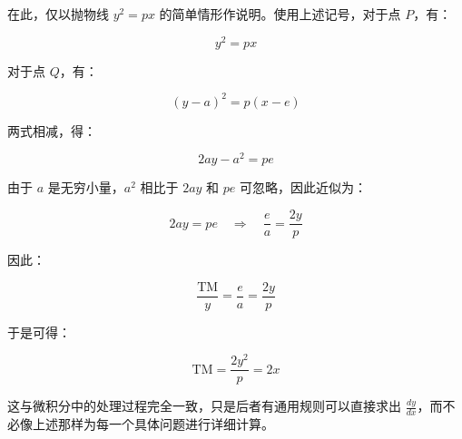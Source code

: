 在此，仅以抛物线 $y^2 = px$ 的简单情形作说明。使用上述记号，对于点 $P$，有：

$$
y^2 = px
$$

对于点 $Q$，有：

$$
(y - a)^2 = p(x - e)
$$

两式相减，得：

$$
2ay - a^2 = pe
$$

由于 $a$ 是无穷小量，$a^2$ 相比于 $2ay$ 和 $pe$ 可忽略，因此近似为：

$$
2ay = pe \quad \Rightarrow \quad \frac{e}{a} = \frac{2y}{p}
$$

因此：

$$
\frac{\mathrm{TM}}{y} = \frac{e}{a} = \frac{2y}{p}
$$

于是可得：

$$
\mathrm{TM} = \frac{2y^2}{p} = 2x
$$

这与微积分中的处理过程完全一致，只是后者有通用规则可以直接求出 $\frac{dy}{dx}$，而不必像上述那样为每一个具体问题进行详细计算。
